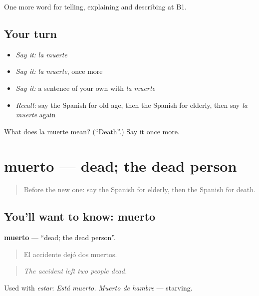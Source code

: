 \begin{grammarlens}[title={What you've built}]
One more word for telling, explaining and describing at B1.
\end{grammarlens}

\subsection*{Your turn}
\begin{itemize}
\raggedright
  \item \emph{Say it:} \emph{la muerte}
  \item \emph{Say it:} \emph{la muerte}, once more
  \item \emph{Say it:} a sentence of your own with \emph{la muerte}
  \item \emph{Recall:} say the Spanish for old age, then the Spanish for elderly, then say \emph{la muerte} again
\end{itemize}

\begin{tcolorbox}[breakable,colback=teal!4,colframe=teal!35!black,title={Before you move on}]
What does la muerte mean? (\textquotedblleft{}Death\textquotedblright{}.) Say it once more.
\end{tcolorbox}
\section[muerto]{muerto — dead; the dead person}

\label{lesson:ES-C555-muerto}



\begin{quote}
Before the new one: say the Spanish for elderly, then the Spanish for death.
\end{quote}

\subsection*{You'll want to know: muerto}
\textbf{muerto} — \textquotedblleft{}dead; the dead person\textquotedblright{}.

\begin{quote}
El accidente dejó dos muertos.
\end{quote}

\begin{quote}
\emph{The accident left two people dead.}
\end{quote}

Used with \emph{estar}: \emph{Está muerto.} \emph{Muerto de hambre} — starving.

